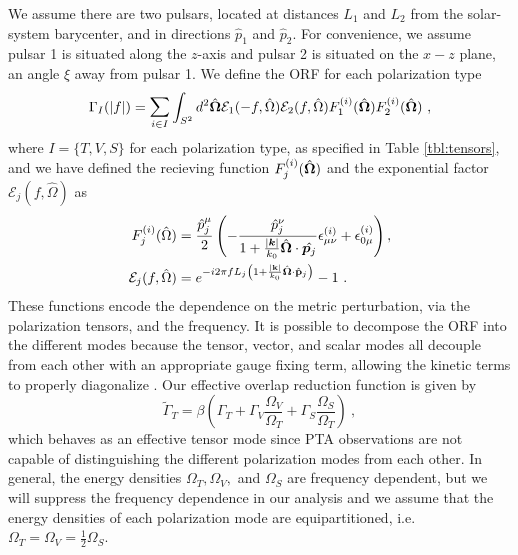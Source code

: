\documentclass[prd,twocolumn,aps,psfig,nofootinbib,nobibnotes,superscriptaddress,preprintnumbers,times]{revtex4-2}
\begin{document}
We assume there are two pulsars, located at distances $L_1$ and $L_2$ from the solar-system barycenter, and in directions $\hat{p}_1$ and $\hat{p}_2$. For convenience, we assume pulsar 1 is situated along the $z$-axis and pulsar 2 is situated on the $x-z$ plane, an angle $\xi$ away from pulsar 1. We define the ORF for each polarization type
\begin{equation}\label{eq:orf_type}
    \Gamma_I(|f|) = \mathlarger{\sum}_{i \in I} \int_{S^2} d^2 \hat{\bf{\Omega}} \mathcal{E}_1(-f, \hat{\Omega}) \mathcal{E}_2(f, \hat{\Omega}) F_1^{(i)}(\hat{\bf{\Omega}}) F_2^{(i)}(\hat{\bf{\Omega}}) \ ,
\end{equation}
where $I = \{T,V,S\}$ for each polarization type, as specified in Table \ref{tbl:tensors}, and we have defined the recieving function $F^{(i)}_j(\hat{\bf \Omega})$ and the exponential factor $\mathcal{E}_j(f, \hat{\Omega})$ as 
\begin{equation}\label{eqn:recieving}
    \begin{aligned}
        F^{(i)}_j(\hat{\Omega}) &= \frac{\hat{p}^\mu_j}{2}\left(-\frac{\hat{p}^\nu_j}{1+\frac{|\boldsymbol{k}|}{k_0} \hat{\boldsymbol{\Omega}} \cdot \hat{\boldsymbol{p}_j}} \epsilon_{\mu \nu}^{(i)}+\epsilon_{0 \mu}^{(i)}\right) , \\ 
        \mathcal{E}_j(f, \hat{\Omega}) &= e^{-i2\pi f L_j\left( 1 + \frac{|{\bf k}|}{k_0} \hat{\bf \Omega}\cdot \hat{\bf p}_j\right)} - 1 \ . 
    \end{aligned}
\end{equation}
These functions encode the dependence on the metric perturbation, via the polarization tensors, and the frequency.
It is possible to decompose the ORF into the different modes because the tensor, vector, and scalar modes all decouple from each other with an appropriate gauge fixing term, allowing the kinetic terms to properly diagonalize \cite{Hinterbichler:2011tt}. Our effective overlap reduction function is given by 
\begin{equation}\label{eq:eff_orf}
    \tilde{\Gamma}_{T} = \beta \left(\Gamma_{T} + \Gamma_{V} \frac{\Omega_V}{\Omega_T} + \Gamma_{S} \frac{\Omega_S}{\Omega_T} \right) \ ,
\end{equation}
which behaves as an effective tensor mode since PTA observations are not capable of distinguishing the different polarization modes from each other. In general, the energy densities $\Omega_T, \Omega_V,$ and $\Omega_S$ are frequency dependent, but we will suppress the frequency dependence in our analysis and we assume that the energy densities of each polarization mode are equipartitioned, i.e.\ $\Omega_T = \Omega_V = \frac{1}{2}\Omega_S$. 
\end{document}
